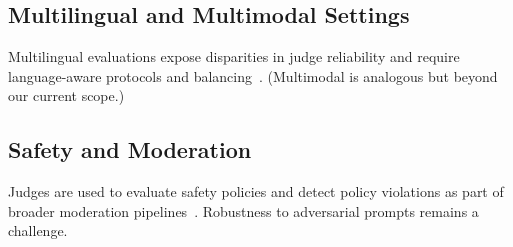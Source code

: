 \subsection{Multilingual and Multimodal Settings}
Multilingual evaluations expose disparities in judge reliability and require language-aware protocols and balancing~\cite{hada2024metal}. (Multimodal is analogous but beyond our current scope.)

\subsection{Safety and Moderation}
Judges are used to evaluate safety policies and detect policy violations as part of broader moderation pipelines~\cite{li2024_llmsasjudges}. Robustness to adversarial prompts remains a challenge.